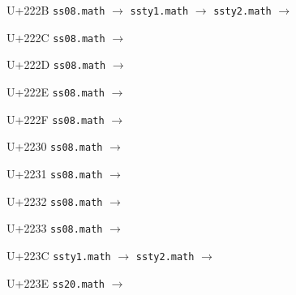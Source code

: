 \documentclass{article}
\begin{document}
\begin{substitutions}
\goodbreak

U+222B  \linebreak
    \texttt{ss08.math} $\to$  \linebreak
    \texttt{ssty1.math} $\to$  \linebreak
    \texttt{ssty2.math} $\to$  

\goodbreak

U+222C  \linebreak
    \texttt{ss08.math} $\to$  

\goodbreak

U+222D  \linebreak
    \texttt{ss08.math} $\to$  

\goodbreak

U+222E  \linebreak
    \texttt{ss08.math} $\to$  

\goodbreak

U+222F  \linebreak
    \texttt{ss08.math} $\to$  

\goodbreak

U+2230  \linebreak
    \texttt{ss08.math} $\to$  

\goodbreak

U+2231  \linebreak
    \texttt{ss08.math} $\to$  

\goodbreak

U+2232  \linebreak
    \texttt{ss08.math} $\to$  

\goodbreak

U+2233  \linebreak
    \texttt{ss08.math} $\to$  

\goodbreak

U+223C  \linebreak
    \texttt{ssty1.math} $\to$  \linebreak
    \texttt{ssty2.math} $\to$  

\goodbreak

U+223E  \linebreak
    \texttt{ss20.math} $\to$  

\goodbreak


\end{substitutions}
\end{document}
